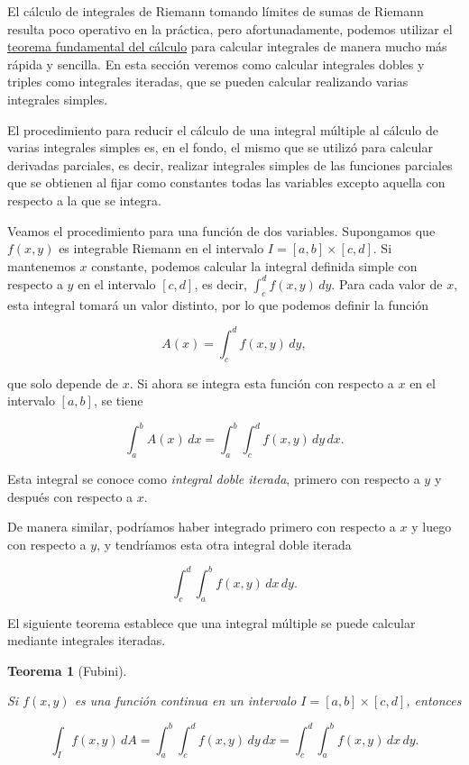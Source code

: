 \documentclass[
  a4paper,
]{scrreport}
\theoremstyle{plain}
\newtheorem{theorem}{Teorema}[chapter]
\theoremstyle{definition}
\theoremstyle{plain}
\theoremstyle{plain}
\theoremstyle{definition}
\theoremstyle{definition}
\theoremstyle{remark}
\begin{document}
El cálculo de integrales de Riemann tomando límites de sumas de Riemann
resulta poco operativo en la práctica, pero afortunadamente, podemos
utilizar el
\href{http://localhost:1313/08-integrales.html\#teorema-fundamental-del-c\%C3\%A1lculo}{teorema
fundamental del cálculo} para calcular integrales de manera mucho más
rápida y sencilla. En esta sección veremos como calcular integrales
dobles y triples como integrales iteradas, que se pueden calcular
realizando varias integrales simples.

El procedimiento para reducir el cálculo de una integral múltiple al
cálculo de varias integrales simples es, en el fondo, el mismo que se
utilizó para calcular derivadas parciales, es decir, realizar integrales
simples de las funciones parciales que se obtienen al fijar como
constantes todas las variables excepto aquella con respecto a la que se
integra.

Veamos el procedimiento para una función de dos variables. Supongamos
que \(f(x,y)\) es integrable Riemann en el intervalo
\(I=[a,b]\times [c,d]\). Si mantenemos \(x\) constante, podemos calcular
la integral definida simple con respecto a \(y\) en el intervalo
\([c,d]\), es decir, \(\int_c^d f(x,y)\, dy\). Para cada valor de \(x\),
esta integral tomará un valor distinto, por lo que podemos definir la
función

\[
A(x) = \int_c^d f(x,y)\,dy,
\]

que solo depende de \(x\). Si ahora se integra esta función con respecto
a \(x\) en el intervalo \([a,b]\), se tiene

\[
\int_a^b A(x)\,dx = \int_a^b\int_c^d f(x,y)\,dy\,dx.
\]

Esta integral se conoce como \emph{integral doble iterada}, primero con
respecto a \(y\) y después con respecto a \(x\).

De manera similar, podríamos haber integrado primero con respecto a
\(x\) y luego con respecto a \(y\), y tendríamos esta otra integral
doble iterada

\[
\int_c^d\int_a^b f(x,y)\,dx\,dy.
\]

El siguiente teorema establece que una integral múltiple se puede
calcular mediante integrales iteradas.

\begin{theorem}[Fubini]\protect\hypertarget{thm-teorema-fubini}{}\label{thm-teorema-fubini}

Si \(f(x,y)\) es una función continua en un intervalo
\(I=[a,b]\times [c,d]\), entonces

\[
\int_I f(x,y)\, dA 
= \int_a^b\int_c^d f(x,y)\,dy\,dx 
= \int_c^d\int_a^b f(x,y)\,dx\,dy.
\]

\end{theorem}
\end{document}
